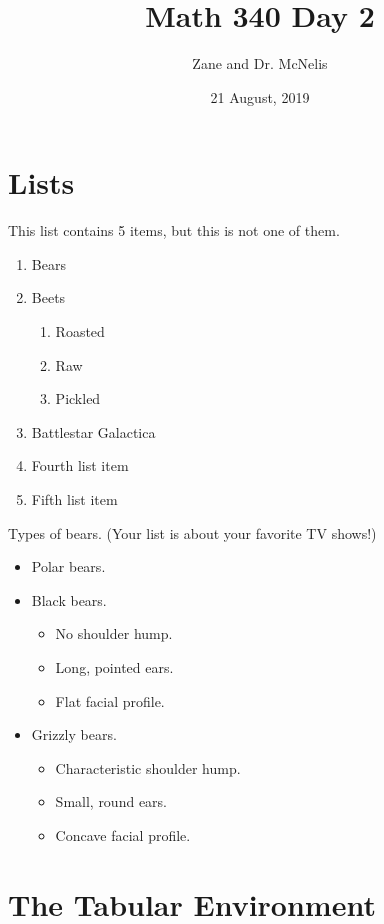 \documentclass{article}
\title{Math 340 Day 2}
\author{Zane and Dr. McNelis}
\date{21 August, 2019}
\begin{document}
\maketitle

\section{Lists}
This list contains 5 items, but this is not one of them.
\begin{enumerate}
    \item Bears
    \item Beets
    \begin{enumerate}
        \item Roasted
        \item Raw
        \item Pickled
    \end{enumerate}
    \item Battlestar Galactica
    \item Fourth list item
    \item Fifth list item
\end{enumerate}

\vspace{0.5cm} %

Types of bears. (Your list is about your favorite TV shows!)
\begin{itemize}
    \item Polar bears.
    \item Black bears.
    \begin{itemize}
        \item No shoulder hump.
        \item Long, pointed ears.
        \item Flat facial profile.
    \end{itemize}
    \item Grizzly bears.
    \begin{itemize}
        \item Characteristic shoulder hump.
        \item Small, round ears.
        \item Concave facial profile.
    \end{itemize}
\end{itemize}

\section{The Tabular Environment}
\end{document}
